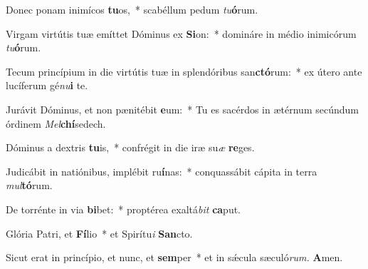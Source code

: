 \item Donec ponam inimícos \textbf{tu}os,~* scabéllum pedum \textit{tu}\textbf{ó}rum.
\item Virgam virtútis tuæ emíttet Dóminus ex \textbf{Si}on:~* domináre in médio inimicórum \textit{tu}\textbf{ó}rum.
\item Tecum princípium in die virtútis tuæ in splendóribus san\textbf{ctó}rum:~* ex útero ante lucíferum gé\tinyhspace\textit{nu}\textbf{i} te.
\item Jurávit Dóminus, et non pænitébit \textbf{e}um:~* Tu es sacérdos in ætérnum secúndum órdinem \textit{Mel}\textbf{chí}sedech.
\item Dóminus a dextris \textbf{tu}is,~* confrégit in die iræ su\tinyhspace\textit{æ} \textbf{re}ges.
\item Judicábit in natiónibus, implébit ru\textbf{í}nas:~* conquassábit cápita in terra \textit{mul}\textbf{tó}rum.
\item De torrénte in via \textbf{bi}bet:~* proptérea exaltá\tinyhspace\textit{bit} \textbf{ca}put.
\item Glória Patri, et \textbf{Fí}lio~* et Spirítu\textit{i} \textbf{San}cto.
\item Sicut erat in princípio, et nunc, et \textbf{sem}per~* et in sǽcula sæculó\textit{rum.} \textbf{A}men.